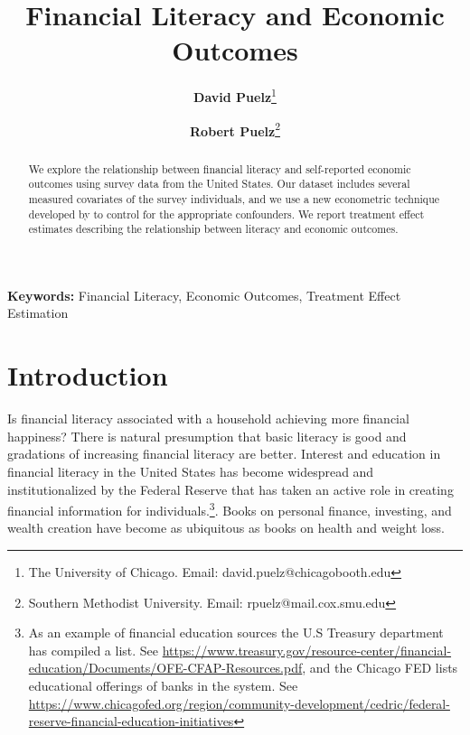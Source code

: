 \documentclass[12pt]{article}
\theoremstyle{plain}
\begin{document}
\title{Financial Literacy and Economic Outcomes}
\author{
\textbf{David Puelz}\thanks{The University of Chicago. Email: david.puelz@chicagobooth.edu} \\ \and \textbf{Robert Puelz}\thanks{Southern Methodist University. Email: rpuelz@mail.cox.smu.edu}
}
\date{}
\maketitle\thispagestyle{empty}


\begin{center}

\vspace{0.3in}

\begin{abstract}
We explore the relationship between financial literacy and self-reported economic outcomes using survey data from the United States.  Our dataset includes several measured covariates of the survey individuals, and we use a new econometric technique developed by \cite{hahn2018regularization} to control for the appropriate confounders.  We report treatment effect estimates describing the relationship between literacy and economic outcomes.
\end{abstract}

\vspace{1.5in}
\end{center}

\textbf{Keywords:} Financial Literacy, Economic Outcomes, Treatment Effect Estimation

\setcounter{page}{0}\thispagestyle{empty}\baselineskip18.99pt\newpage 
{}

\clearpage

\pagestyle{plain}

\section{Introduction}
Is financial literacy associated with a household achieving more financial happiness?  There is natural presumption that basic literacy is good and gradations of increasing financial literacy are better. Interest and education in financial literacy in the United States has become widespread and institutionalized by the Federal Reserve that has taken an active role in creating financial information for individuals.\footnote{As an example of financial education sources the U.S Treasury department has compiled a list. See \href{https://www.treasury.gov/resource-center/financial-education/Documents/OFE-CFAP-Resources.pdf}{https://www.treasury.gov/resource-center/financial-education/Documents/OFE-CFAP-Resources.pdf}, and the Chicago FED lists educational offerings of banks in the system. See \href{https://www.chicagofed.org/region/community-development/cedric/federal-reserve-financial-education-initiatives}{https://www.chicagofed.org/region/community-development/cedric/federal-reserve-financial-education-initiatives}}.  Books on personal finance, investing, and wealth creation have become as ubiquitous as books on health and weight loss.
\end{document}
